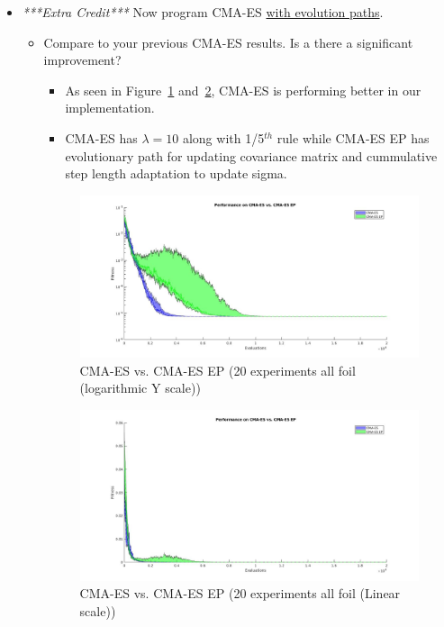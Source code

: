 \documentclass{article}
\begin{document}
\begin{itemize}
	\item \textit{***Extra Credit***} Now program CMA-ES \underline{with evolution paths}.
		\begin{itemize}
		\item Compare to your previous CMA-ES results. Is a there a significant improvement?
			\color{blue}
            \begin{itemize}
                \item As seen in Figure~\ref{fig:9} and~\ref{fig:10}, CMA-ES is performing better in our implementation.
                \item CMA-ES has $\lambda = 10$ along with 1/5$^{th}$ rule while CMA-ES EP has evolutionary path for updating covariance matrix and cummulative step length adaptation to update sigma.
            \end{itemize}
            \color{black}
        \begin{figure}[ht!]
            \centering
            \includegraphics[width=1.0\linewidth]{cmaes_cmaesep_20exp_3foil.jpg}
            \caption{CMA-ES vs. CMA-ES EP (20 experiments all foil (logarithmic Y scale))\label{fig:9}}
        \end{figure}
        \begin{figure}[ht!]
            \centering
            \includegraphics[width=1.0\linewidth]{cmaes_cmaesep_20exp_3foil_linear.jpg}
            \caption{CMA-ES vs. CMA-ES EP (20 experiments all foil (Linear scale)) \label{fig:10}}
        \end{figure}
		\end{itemize}
        \newpage
\end{itemize}
\end{document}
